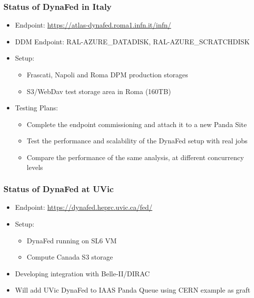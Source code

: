 \documentclass{beamer}
\begin{document}
\begin{frame}
  \frametitle{Status of DynaFed in Italy}
  \begin{itemize}
    \item Endpoint: \url{https://atlas-dynafed.roma1.infn.it/infn/}
		\item DDM Endpoint: RAL-AZURE\_DATADISK, RAL-AZURE\_SCRATCHDISK
    \item Setup:
    \begin{itemize}
      \item Frascati, Napoli and Roma DPM  production storages
      \item S3/WebDav test storage area in Roma (160TB)
    \end{itemize}
		\item Testing Plans:
    \begin{itemize}
      \item Complete the endpoint commissioning and attach it to a new Panda Site
      \item Test the performance and scalability of the DynaFed setup with real jobs
      \item Compare the performance of the same analysis, at different concurrency levels
    \end{itemize}
  \end{itemize}
\end{frame}

\begin{frame}
  \frametitle{Status of DynaFed at UVic}
  \begin{itemize}
    \item Endpoint: \url{https://dynafed.heprc.uvic.ca/fed/}
    \item Setup:
    \begin{itemize}
      \item DynaFed running on SL6 VM
      \item Compute Canada S3 storage
    \end{itemize}
		\item Developing integration with Belle-II/DIRAC
    \item Will add UVic DynaFed to IAAS Panda Queue using CERN example as graft
  \end{itemize}
\end{frame}
\end{document}
